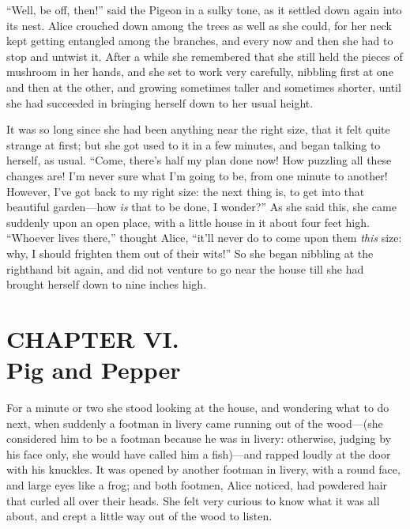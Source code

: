\documentclass[11pt,openany,oneside]{book}
\begin{document}
“Well, be off, then!” said the Pigeon in a sulky tone, as it settled down again into its nest. Alice crouched down among the trees as well as she could, for her neck kept getting entangled among the branches, and every now and then she had to stop and untwist it. After a while she remembered that she still held the pieces of mushroom in her hands, and she set to work very carefully, nibbling first at one and then at the other, and growing sometimes taller and sometimes shorter, until she had succeeded in bringing herself down to her usual height. 

It was so long since she had been anything near the right size, that it felt quite strange at first; but she got used to it in a few minutes, and began talking to herself, as usual. “Come, there’s half my plan done now! How puzzling all these changes are! I’m never sure what I’m going to be, from one minute to another! However, I’ve got back to my right size: the next thing is, to get into that beautiful garden—how {\em is\/} that to be done, I wonder?” As she said this, she came suddenly upon an open place, with a little house in it about four feet high. “Whoever lives there,” thought Alice, “it’ll never do to come upon them {\em this\/} size: why, I should frighten them out of their wits!” So she began nibbling at the righthand bit again, and did not venture to go near the house till she had brought herself down to nine inches high. 


\clearpage{}
{}
\chapter*{CHAPTER VI.\\  Pig and Pepper}
\leavevmode\hypertarget{d9.fp81080}{}For a minute or two she stood looking at the house, and wondering what to do next, when suddenly a footman in livery came running out of the wood—(she considered him to be a footman because he was in livery: otherwise, judging by his face only, she would have called him a fish)—and rapped loudly at the door with his knuckles. It was opened by another footman in livery, with a round face, and large eyes like a frog; and both footmen, Alice noticed, had powdered hair that curled all over their heads. She felt very curious to know what it was all about, and crept a little way out of the wood to listen. 
\end{document}

